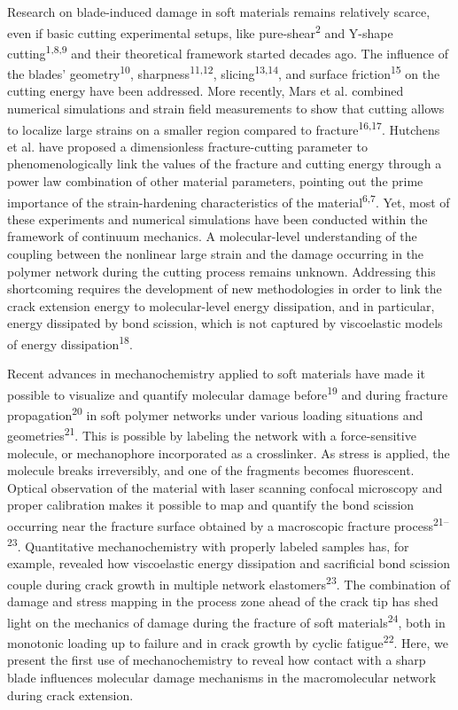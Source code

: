 \documentclass{article}
\begin{document}
Research on blade-induced damage in soft materials remains relatively scarce, even if basic cutting experimental setups, like pure-shear\textsuperscript{2} and Y-shape cutting\textsuperscript{1,8,9} and their theoretical framework started decades ago. The influence of the blades’ geometry\textsuperscript{10}, sharpness\textsuperscript{11,12}, slicing\textsuperscript{13,14}, and surface friction\textsuperscript{15} on the cutting energy have been addressed. More recently, Mars et al. combined numerical simulations and strain field measurements to show that cutting allows to localize large strains on a smaller region compared to fracture\textsuperscript{16,17}. Hutchens et al. have proposed a dimensionless fracture-cutting parameter to phenomenologically link the values of the fracture and cutting energy through a power law combination of other material parameters, pointing out the prime importance of the strain-hardening characteristics of the material\textsuperscript{6,7}. Yet, most of these experiments and numerical simulations have been conducted within the framework of continuum mechanics. A molecular-level understanding of the coupling between the nonlinear large strain and the damage occurring in the polymer network during the cutting process remains unknown. Addressing this shortcoming requires the development of new methodologies in order to link the crack extension energy to molecular-level energy dissipation, and in particular, energy dissipated by bond scission, which is not captured by viscoelastic models of energy dissipation\textsuperscript{18}.

Recent advances in mechanochemistry applied to soft materials have made it possible to visualize and quantify molecular damage before\textsuperscript{19} and during fracture propagation\textsuperscript{20} in soft polymer networks under various loading situations and geometries\textsuperscript{21}. This is possible by labeling the network with a force-sensitive molecule, or mechanophore incorporated as a crosslinker. As stress is applied, the molecule breaks irreversibly, and one of the fragments becomes fluorescent. Optical observation of the material with laser scanning confocal microscopy and proper calibration makes it possible to map and quantify the bond scission occurring near the fracture surface obtained by a macroscopic fracture process\textsuperscript{21–23}. Quantitative mechanochemistry with properly labeled samples has, for example, revealed how viscoelastic energy dissipation and sacrificial bond scission couple during crack growth in multiple network elastomers\textsuperscript{23}. The combination of damage and stress mapping in the process zone ahead of the crack tip has shed light on the mechanics of damage during the fracture of soft materials\textsuperscript{24}, both in monotonic loading up to failure and in crack growth by cyclic fatigue\textsuperscript{22}. Here, we present the first use of mechanochemistry to reveal how contact with a sharp blade influences molecular damage mechanisms in the macromolecular network during crack extension.
\end{document}
